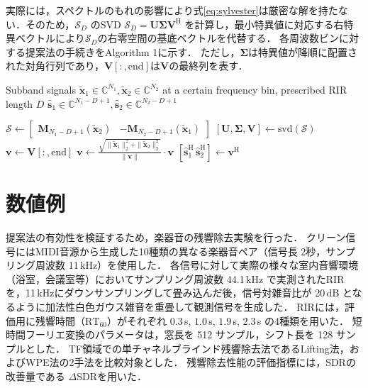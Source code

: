 \documentclass[10pt,twocolumn,dvipdfmx]{jarticle} %
\begin{document}
実際には，スペクトルのもれの影響により式\eqref{eq:sylvester}は厳密な解を持たない．そのため，$\bm{\mathcal{S}}_D$ のSVD $\bm{\mathcal{S}}_D = \mathbf{U} \bm{\Sigma} \mathbf{V}^\mathrm{H}$ を計算し，最小特異値に対応する右特異ベクトルにより$\bm{\mathcal{S}}_D$の右零空間の基底ベクトルを代替する．
各周波数ビンに対する提案法の手続きをAlgorithm 1に示す．
ただし，$\mathbf{\Sigma}$は特異値が降順に配置された対角行列であり，$\mathbf{V}[:,\text{end}]$は$\mathbf{V}$の最終列を表す．

\begin{algorithm}[t]
\caption{Sub-band Monoaural CR Method}
\label{alg:sylDerev_simple}
\begin{algorithmic}[1]
\Require Subband signals $\tilde{\bm{x}}_1\in\mathbb{C}^{N_1}, \tilde{\bm{x}}_2\in\mathbb{C}^{N_2}$ at a certain frequency bin, prescribed RIR length $D$
\Ensure $\hat{{\bm{s}}}_1 \in \mathbb{C}^{N_1-D+1}, \hat{{\bm{s}}}_2\in \mathbb{C}^{N_2-D+1}$

\State $\bm{\mathcal{S}} \gets \begin{bmatrix}
\mathbf{M}_{N_1-D+1}(\tilde{\bm{x}}_2) & -\mathbf{M}_{N_2-D+1}(\tilde{\bm{x}}_1)
\end{bmatrix}$
\State $[\mathbf{U}, \bm{\Sigma}, \mathbf{V}] \gets \text{svd}(\bm{\mathcal{S}})$
\State $\bm{v} \gets \mathbf{V}[:, \text{end}]$ 
\State $\bm{v} \gets \frac{\sqrt{\|\tilde{\bm{x}}_1\|^2_2 + \|\tilde{\bm{x}}_2\|^2_2}}{\|\bm{v}\|} \cdot \bm{v}$ 
\State $[\hat{\bm{s}}_1^\mathrm{H} \, \hat{\bm{s}}_2^\mathrm{H} ]  \gets \bm{v}^\mathrm{H}$
\end{algorithmic}
\end{algorithm}


\section{数値例}
提案法の有効性を検証するため，楽器音の残響除去実験を行った．
クリーン信号にはMIDI音源から生成した10種類の異なる楽器音ペア（信号長 2秒，サンプリング周波数 11\,kHz）を使用した．
各信号に対して実際の様々な室内音響環境（浴室，会議室等）においてサンプリング周波数 44.1\,kHz で実測されたRIRを，11\,kHzにダウンサンプリングして畳み込んだ後，信号対雑音比が 20\,dB となるように加法性白色ガウス雑音を重畳して観測信号を生成した．
RIRには，評価用に残響時間（$\textrm{RT}_{60}$）がそれぞれ $0.3$\,s, $1.0$\,s, $1.9$\,s, $2.3$\,s の4種類を用いた．
短時間フーリエ変換のパラメータは，窓長を 512 サンプル，シフト長を 128 サンプルとした．
TF領域での単チャネルブラインド残響除去法であるLifting法\cite{yohena}，およびWPE法\cite{wpe}の2手法を比較対象とした．
残響除去性能の評価指標には，SDRの改善量である $\Delta$SDRを用いた．
\end{document}
